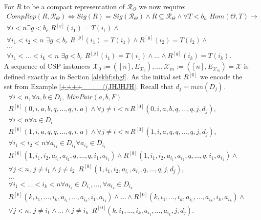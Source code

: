 \documentclass{article}
\theoremstyle{definition}
\theoremstyle{theorem}
\theoremstyle{theorem}
\theoremstyle{remark}
\theoremstyle{remark}
\theoremstyle{example}
\theoremstyle{notation}
\theoremstyle{theorem}
\begin{document}
For $R$ to be a compact representation of $\mathscr{R}_{\Theta}$ we now require:
\begin{equation}
    \begin{gathered}
        CompRep(R,\mathscr{R}_{\Theta}) \iff 
        Sig(R)=Sig(\mathscr{R}_{\Theta}) \wedge R\subseteq \mathscr{R}_{\Theta} \wedge \forall T< b_h \,\, Hom(\Theta, T)\rightarrow\\
        \forall i<n \exists g<b_r\,\, R^{[g]}(i_1) = T(i_1)\wedge\\
         \forall i_1<i_2<n\,\,\exists g<b_r\,\, R^{[g]}(i_1) = T(i_1)\wedge R^{[g]}(i_2) = T(i_2) \wedge \\
         \ldots \\
         \forall i_1<\ldots <i_k<n\,\,\exists g<b_r\,\, R^{[g]}(i_1) = T(i_1)\wedge \ldots \wedge R^{[g]}(i_k) = T(i_k).
    \end{gathered}
\end{equation}
A sequence of CSP instances $\mathcal{X}_0:=([n], E_{\mathcal{X}_0}), \ldots, \mathcal{X}_m:=([n], E_{\mathcal{X}_m}) = \mathcal{X}$ is defined exactly as in Section \ref{alskhf;shgf}. As the initial set $R^{[0]}$ we encode the set from Example \ref{++++____((JHJHJH}. Recall that $d_j = min(D_j)$.
\begin{equation}
    \begin{gathered}\label{askjfh;ashfd}
\forall i<n, \forall a,b\in D_i,\, MinPair(a,b,F)\\
R^{[0]}(0,i, a,b ,q,\ldots,q,i,a)\wedge \forall j \neq i < n \, R^{[0]}( 0,i, a,b ,q,\ldots,q,j,d_j), \\
\forall i<n\forall a\in D_i\\
R^{[0]}(1,i, a,q ,q,\ldots,q,i,a)\wedge \forall j \neq i < n \, R^{[0]}( 1,i, a, q,q,\ldots,q,j,d_j),\\
\forall i_1<i_2<n\forall a_{i_1}\in D_{i_1}\forall a_{i_2}\in D_{i_1} \\
R^{[0]}(1,i_1,i_2,a_{i_1},a_{i_2},q ,\ldots,q,i_1,a_{i_1})\wedge R^{[0]}(1,i_1,i_2,a_{i_1},a_{i_2},q,\ldots,q,i_1,a_{i_1})\wedge \\
\forall j<n,\, j\neq i_1\wedge j\neq i_2\,\, \, R^{[0]}(1,i_1,i_2,a_{i_1},a_{i_2},q ,\ldots,q,j,d_j),\\
\ldots \\
\forall i_1<\ldots <i_k<n\forall a_{i_1}\in D_{i_1},\ldots,\forall a_{i_k}\in D_{i_k} \\
R^{[0]}(k,i_1,\ldots,i_k,a_{i_1},\ldots,a_{i_k},i_1,a_{i_1})\wedge \ldots \wedge R^{[0]}(k,i_1,\ldots,i_k,a_{i_1},\ldots,a_{i_k},i_k,a_{i_k})\wedge \\
\forall j<n,\, j\neq i_1\wedge\ldots \wedge j\neq i_k\,\, \, R^{[0]}(k,i_1,\ldots,i_k,a_{i_1},\ldots,a_{i_k},j,d_j).
    \end{gathered}
\end{equation}
\end{document}
